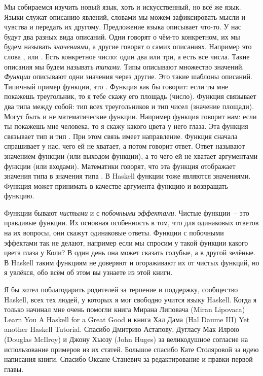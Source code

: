 Мы собираемся изучить новый язык, хоть и искусственный,
но всё же язык. Языки служат описанию явлений, словами
мы можем зафиксировать мысли и чувства и передать их
другому. Предложение языка описывает что-то. 
У нас будут два разных вида описаний. Одни
говорят о чём-то конкретном, их мы будем называть \emph{значениями},
а другие говорят о самих описаниях.
Например это слова ,  или . 
Есть конкретное число: один два или три, а есть все числа. 
Такие описания мы будем называть \emph{типами}. Типы описывают множество 
значений.  \emph{Функции} описывают одни значения через другие.
Это такие шаблоны описаний. Типичный пример функции, это
. Функция как бы говорит:
если ты мне покажешь треугольник, то я тебе скажу его площадь (число).
Функция  связывает
два типа между собой: тип всех треугольников и тип чисел (значение площади).
Могут быть и не математические функции. Например функция
 говорит нам: если ты покажешь мне
человека, то я скажу какого цвета у него глаза. Эта функция
связывает тип  и тип . При этом
связь имеет направление. Функция сначала спрашивает у нас,
чего ей не хватает, а потом говорит ответ. Ответ называют
значением функции (или выходом функции), а то чего ей не хватает
аргументами функции (или входами). Математики 
говорят, что эта функция отображает значения типа 
в значения типа  . В Haskell функции тоже
являются значениями. Функция может принимать в качестве аргумента
функцию и возвращать функцию. 

Функции бывают \emph{чистыми} и с 
 \emph{побочными эффектами}. 
Чистые функции~-- это правдивые функции. Их основная особенность в том, что
для одинаковых ответов на их вопросы, они скажут одинаковые ответы.
Функции с побочными эффектами так не делают, например если
мы спросим у такой функции какого цвета глаза у Коли? 
В один день она может сказать голубые, а в другой зелёные. 
В Haskell таким функциям не доверяют и огораживают их
от чистых функций, но я увлёкся, обо всём об этом вы узнаете
из этой книги.


Я бы хотел поблагодарить родителей за терпение и поддержку,
сообщество Haskell, всех тех
людей, у которых я мог свободно учится языку Haskell. 
Когда я только начинал мне очень помогли 
книга Мирана Липовача (Miran Lipovaca)
Learn You A Haskell for a Great Good и книга Хал Дама 
(Hal Daume III) Yet another Haskell Tutorial.
Спасибо Дмитрию Астапову, Дугласу Мак Илрою (Douglas McIlroy) и 
Джону Хьюзу (John Huges) за великодушное согласие на использование
примеров из их статей. 
Большое спасибо Кате Столяровой за идею написания книги. 
Спасибо Оксане Станевич за редактирование и правки первой главы. 

